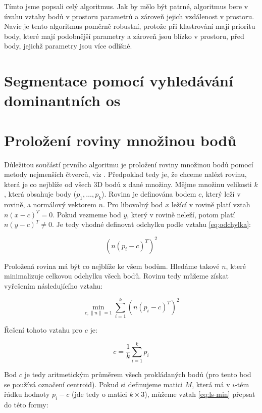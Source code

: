 \documentclass[11pt,twoside,a4paper]{book}
\begin{document}
Tímto jsme popsali celý algoritmus. Jak by mělo být patrné, algoritmus bere v úvahu vztahy bodů v prostoru parametrů a zároveň jejich vzdálenost v prostoru. Navíc je tento algoritmus poměrně robustní, protože při klastrování mají prioritu body, které mají podobnější parametry a zároveň jsou blízko v prostoru, před body, jejichž parametry jsou více odlišné.


\section{Segmentace pomocí vyhledávání dominantních os}

\cite{Seg02}


\section{Proložení roviny množinou bodů}
\label{sub:lsq}
Důležitou součástí prvního algoritmu je proložení roviny množinou bodů pomocí metody nejmenších čtverců, viz \cite{wiki:leastsq}. Předpoklad tedy je, že chceme nalézt rovinu, která je co nejblíže od všech 3D bodů z dané množiny. Mějme množinu velikosti $k$, která obsahuje body ($p_1, \ldots, p_k$). Rovina je definována bodem $c$, který leží v rovině, a normálový vektorem $n$. Pro libovolný bod $x$ ležící v rovině platí vztah $n(x - c)^T = 0$. Pokud vezmeme bod $y$, který v rovině neleží, potom platí $n(y - c)^T \neq 0$. Je tedy vhodné definovat odchylku podle vztahu \ref{eq:odchylka}:

\begin{equation}
\label{eq:odchylka}
(n (p_i - c)^T)^2
\end{equation}

Proložená rovina má být co nejblíže ke všem bodům. Hledáme takové $n$, které minimalizuje celkovou odchylku všech bodů. Rovinu tedy můžeme získat vyřešením následujícího vztahu:

\begin{equation}
\label{eq:ls-min}
\min_{c,\|n\|=1} \sum\limits_{i=1}^k (n (p_i - c)^T)^2
\end{equation}

Řešení tohoto vztahu pro $c$ je:

\begin{equation}
c = \frac{1}{k} \sum\limits_{i=1}^k p_i
\end{equation}

Bod $c$ je tedy aritmetickým průměrem všech prokládaných bodů (pro tento bod se používá označení centroid). Pokud si definujeme matici $M$, která má v $i$-tém řádku hodnoty $p_i - c$ (jde tedy o matici $k \times 3$), můžeme vztah  \ref{eq:ls-min} přepsat do této formy:
\end{document}
